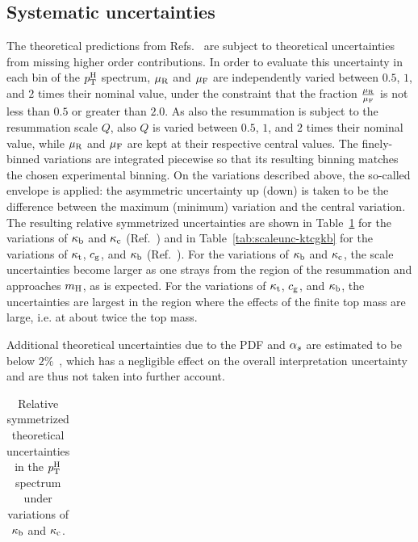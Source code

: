 \subsection{Systematic uncertainties}

The theoretical predictions from Refs.~\cite{Bishara:2016jga,Grazzini:2017szg,Grazzini:2016paz} are subject to theoretical uncertainties from missing higher order contributions.
% 
In order to evaluate this uncertainty in each bin of the $p_\mathrm{T}^\mathrm{H}$ spectrum, $\mu_\mathrm{R}$ and $\mu_\mathrm{F}$ are independently varied between $0.5$, $1$, and $2$ times their nominal value, under the constraint that the fraction $\frac{\mu_\mathrm{R}}{\mu_\mathrm{F}}$ is not less than $0.5$ or greater than $2.0$.
% 
As also the resummation is subject to the resummation scale $Q$, also $Q$ is varied between $0.5$, $1$, and $2$ times their nominal value, while $\mu_\mathrm{R}$ and $\mu_\mathrm{F}$ are kept at their respective central values.
% 
The finely-binned variations are integrated piecewise so that its resulting binning matches the chosen experimental binning.
% 
On the variations described above, the so-called envelope is applied: the asymmetric uncertainty up (down) is taken to be the difference between the maximum (minimum) variation and the central variation.
% 
The resulting relative symmetrized uncertainties are shown in Table~\ref{tab:scaleunc-kbkc} for the variations of $\kappa_{\mathrm{b}}$ and $\kappa_{\mathrm{c}}$ (Ref.~\cite{Bishara:2016jga}) and in Table~\ref{tab:scaleunc-ktcgkb} for the variations of $\kappa_{\mathrm{t}}$, $c_\mathrm{g}$, and $\kappa_{\mathrm{b}}$ (Ref.~\cite{Grazzini:2017szg,Grazzini:2016paz}).
% 
For the variations of $\kappa_{\mathrm{b}}$ and $\kappa_{\mathrm{c}}$, the scale uncertainties become larger as one strays from the region of the resummation and approaches $m_{\mathrm{H}}$, as is expected.
% 
For the variations of $\kappa_{\mathrm{t}}$, $c_\mathrm{g}$, and $\kappa_{\mathrm{b}}$, the uncertainties are largest in the region where the effects of the finite top mass are large, i.e. at about twice the top mass.


Additional theoretical uncertainties due to the PDF and $\alpha_s$ are estimated to be below $2\%$~\cite{Bishara:2016jga}, which has a negligible effect on the overall interpretation uncertainty and are thus not taken into further account.



\begin{table}[htb]
\caption{
    Relative symmetrized theoretical uncertainties in the $p_\mathrm{T}^\mathrm{H}$ spectrum under variations of $\kappa_{\mathrm{b}}$ and $\kappa_{\mathrm{c}}$.
    }
\label{tab:scaleunc-kbkc}
\footnotesize
\begin{center}
\begin{tabular}{lccccc}
\hline

\hline
\end{tabular}
\end{center}
\end{table}

